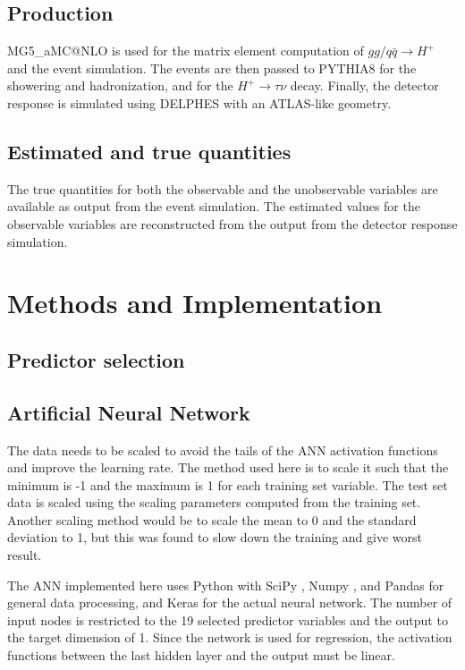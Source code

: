 \documentclass{scrartcl}
\begin{document}
\subsection{Production}
MG5\_aMC@NLO \cite{Alwall:2014hca} is used for the matrix element computation of $gg / q \bar q \to H^+$ and the event simulation. The events are then passed to PYTHIA8 \cite{Sjöstrand2015159} for the showering and hadronization, and for the $H^+\to \tau\nu$ decay. Finally, the detector response is simulated using DELPHES \cite{Favereau2014} with an ATLAS-like geometry.

\subsection{Estimated and true quantities}
The true quantities for both the observable and the unobservable variables are available as output from the event simulation. The estimated values for the observable variables are reconstructed from the output from the detector response simulation.

\section{Methods and Implementation}

\subsection{Predictor selection}

\subsection{Artificial Neural Network}

The data needs to be scaled to avoid the tails of the \gls{ANN} activation functions and improve the learning rate. The method used here is to scale it such that the minimum is -1 and the maximum is 1 for each training set variable. The test set data is scaled using the scaling parameters computed from the training set. Another scaling method would be to scale the mean to 0 and the standard deviation to 1, but this was found to slow down the training and give worst result.

The \gls{ANN} implemented here uses Python with SciPy \cite{scipy}, Numpy \cite{numpy}, and Pandas \cite{pandas} for general data processing, and Keras \cite{keras} for the actual neural network. The number of input nodes is restricted to the 19 selected predictor variables and the output to the target dimension of 1. Since the network is used for regression, the activation functions between the last hidden layer and the output must be linear.
\end{document}
